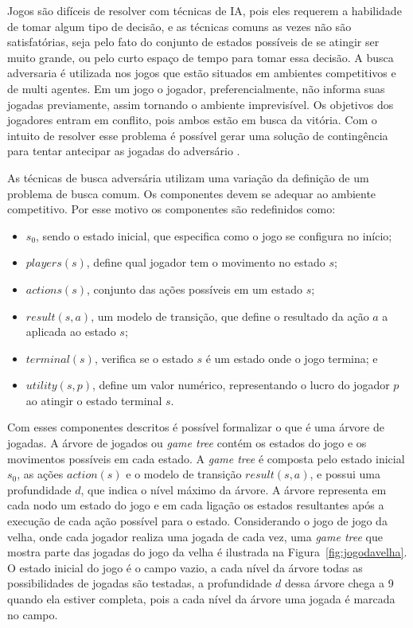 Jogos são difíceis de resolver com técnicas de IA, pois eles requerem a habilidade de tomar algum tipo de decisão, e as técnicas comuns as vezes não são satisfatórias, seja pelo fato do conjunto de estados possíveis de se atingir ser muito grande, ou pelo curto espaço de tempo para tomar essa decisão.
A busca adversaria é utilizada nos jogos que estão situados em ambientes competitivos e de multi agentes. 
Em um jogo o jogador, preferencialmente, não informa suas jogadas previamente, assim tornando o ambiente imprevisível. 
Os objetivos dos jogadores entram em conflito, pois ambos estão em busca da vitória. 
Com o intuito de resolver esse problema é possível gerar uma solução de contingência para tentar antecipar as jogadas do adversário \cite{intelligence2003modern}. 

As técnicas de busca adversária utilizam uma variação da definição de um problema de busca comum. 
Os componentes devem se adequar ao ambiente competitivo. 
Por esse motivo os componentes são redefinidos como:

\begin{itemize}
	\item $s_{0}$, sendo o estado inicial, que especifica como o jogo se configura no início;
	\item $players(s)$, define qual jogador tem o movimento no estado $s$;
	\item $actions(s)$, conjunto das ações possíveis em um estado $s$;
	\item $result(s, a)$, um modelo de transição, que define o resultado da ação $a$ a aplicada ao estado $s$;
	\item $terminal(s)$, verifica se o estado $s$ é um estado onde o jogo termina; e
	\item $utility(s,p)$, define um valor numérico, representando o lucro do jogador $p$ ao atingir o estado terminal $s$.
\end{itemize}

Com esses componentes descritos é possível formalizar o que é uma árvore de jogadas. 
A árvore de jogados ou \textit{game tree} contém os estados do jogo e os movimentos possíveis em cada estado. 
A \textit{game tree} é composta pelo estado inicial $s_{0}$, as ações $action(s)$ e o modelo de transição $result(s, a)$, e possui uma profundidade $d$, que indica o nível máximo da árvore. 
A árvore representa em cada nodo um estado do jogo e em cada ligação os estados resultantes após a execução de cada ação possível para o estado. 
Considerando o jogo de jogo da velha, onde cada jogador realiza uma jogada de cada vez, uma \textit{game tree} que mostra parte das jogadas do jogo da velha é ilustrada na Figura~\ref{fig:jogodavelha}. 
O estado inicial do jogo é o campo vazio, a cada nível da árvore todas as possibilidades de jogadas são testadas, a profundidade $d$ dessa árvore chega a 9 quando ela estiver completa, pois a cada nível da árvore uma jogada é marcada no campo. 

